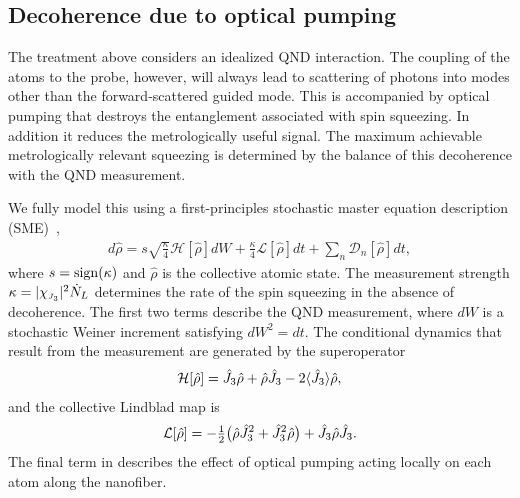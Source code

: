 \documentclass[preprint, aps,pra,onecolumn]{revtex4-1} %
\newcommand{\jz}{\hat{J}_3}
\newcommand{\chieff}{\chi_{\raisebox{-.1pt}{\tiny $J_3$}}}
\begin{document}
	\subsection{Decoherence due to optical pumping}
	
The treatment above considers an idealized QND interaction. 
The coupling of the atoms to the probe, however, will always lead to scattering of photons into modes other than the forward-scattered guided mode.  
This is accompanied by optical pumping that destroys the entanglement associated with spin squeezing.  In addition it reduces the metrologically useful signal.  
The maximum achievable metrologically relevant squeezing is determined by the balance of this decoherence with the QND measurement. 

We fully model this using a first-principles stochastic master equation description (SME)~\cite{jacobs_straightforward_2006, baragiola_three-dimensional_2014},
	\begin{align} \label{Eq::SME}
		d \hat{\rho} = s\sqrt{\frac{\kappa}{4}} \mathcal{H}[\hat{\rho}] dW + \frac{\kappa}{4} \mathcal{L}[\hat{\rho}] dt + \sum_n \mathcal{D}_n [\hat{\rho}] dt,
	\end{align}
where $s = {\rm sign}(\kappa)$ and $\hat{\rho}$ is the collective atomic state. 
The measurement strength $\kappa =|\chieff|^2 \dot{N}_L$ determines the rate of the spin squeezing in the absence of decoherence.  
The first two terms describe the QND measurement, where $dW$ is a stochastic Weiner increment satisfying $dW^2 = dt$. 
The conditional dynamics that result from the measurement are generated by the superoperator
	\begin{align}
		\mathcal{H}[\hat{\rho}] = \jz \hat{\rho} + \hat{\rho} \jz - 2 \expt{\jz} \hat{\rho},
	\end{align}
and the collective Lindblad map is
	\begin{align}
		\mathcal{L}[\hat{\rho}] = - \smallfrac{1}{2} \big( \hat{\rho}  \jz^2 + \jz^2 \hat{\rho} \big) + \jz \hat{\rho} \jz.
	\end{align}
The final term in  describes the effect of optical pumping acting locally on each atom along the nanofiber. 
\end{document}
